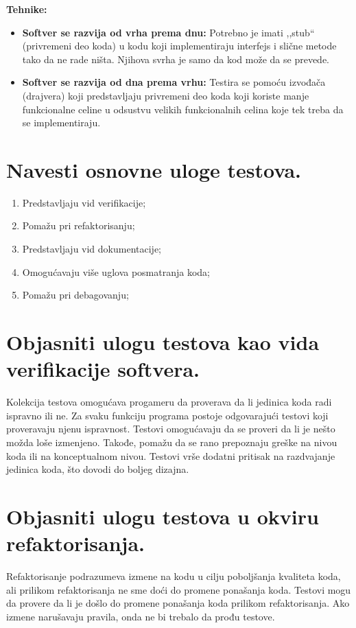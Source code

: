 \documentclass[a4paper]{article}
\begin{document}
  \noindent \textbf{Tehnike:}
  \begin{itemize}
    \item \textbf{Softver se razvija od vrha prema dnu:} Potrebno je imati ,,stub`` (privremeni deo 
          koda) u kodu koji implementiraju interfejs i slične metode tako da ne rade ništa. Njihova
          svrha je samo da kod može da se prevede. 
    \item \textbf{Softver se razvija od dna prema vrhu:} Testira se pomoću izvođača (drajvera) koji
          predstavljaju privremeni deo koda koji koriste manje funkcionalne celine u odsustvu
          velikih funkcionalnih celina koje tek treba da se implementiraju.
  \end{itemize}

\section{Navesti osnovne uloge testova.}
  \begin{enumerate}
    \item Predstavljaju vid verifikacije;
    \item Pomažu pri refaktorisanju;
    \item Predstavljaju vid dokumentacije;
    \item Omogućavaju više uglova posmatranja koda;
    \item Pomažu pri debagovanju;
  \end{enumerate}

\section{Objasniti ulogu testova kao vida verifikacije softvera.}
  Kolekcija testova omogućava progameru da proverava da li jedinica koda radi ispravno ili ne.
  Za svaku funkciju programa postoje odgovarajući testovi koji proveravaju njenu ispravnost. 
  Testovi omogućavaju da se proveri da li je nešto možda loše izmenjeno. Takođe, pomažu da se rano
  prepoznaju greške na nivou koda ili na konceptualnom nivou. Testovi vrše dodatni pritisak
  na razdvajanje jedinica koda, što dovodi do boljeg dizajna. 

\section{Objasniti ulogu testova u okviru refaktorisanja.}
  Refaktorisanje podrazumeva izmene na kodu u cilju poboljšanja kvaliteta koda, ali
  prilikom refaktorisanja ne sme doći do promene ponašanja koda. Testovi mogu da provere
  da li je došlo do promene ponašanja koda prilikom refaktorisanja. Ako izmene narušavaju
  pravila, onda ne bi trebalo da prođu testove.
\end{document}
